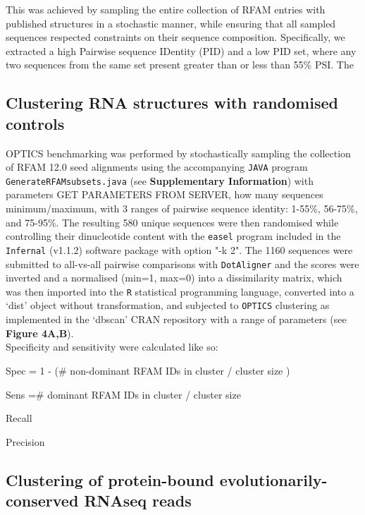 \documentclass[a4paper,11pt]{article}
\newcommand\dotaligner{\texttt{DotAligner}}
\begin{document}
This was achieved by sampling the entire collection of RFAM entries with published structures 
in a stochastic manner, while ensuring that all sampled sequences respected constraints 
on their sequence composition. Specifically, we extracted a high Pairwise sequence IDentity (PID) 
and a low PID set, where any two sequences from the same set present greater than or less than 
55\% PSI. The 

\subsection*{ Clustering RNA structures with randomised controls }
OPTICS benchmarking was performed by stochastically sampling the collection of RFAM 12.0 
seed alignments using the accompanying \texttt{JAVA} program \texttt{GenerateRFAMsubsets.java}
(see \textbf{Supplementary Information}) with parameters {\color{red} GET PARAMETERS FROM SERVER, how many sequences minimum/maximum}, 
with 3 ranges of pairwise sequence identity: 1-55\%, 56-75\%, and 75-95\%.  The resulting
580 unique sequences were then randomised while controlling their dinucleotide content with 
the \texttt{easel} program included in the \texttt{Infernal} (v1.1.2) software package 
\cite{nawrocki2013infernal} with option "-k 2". The 1160 sequences were submitted to 
all-vs-all pairwise comparisons with \dotaligner{} and the scores were inverted and a 
normalised (min=1, max=0) into a dissimilarity matrix, which was then imported into
 the \texttt{R} statistical programming language, converted into a `dist' object without
 transformation, and subjected to \texttt{OPTICS} clustering as implemented
in the `dbscan' CRAN repository with a range of parameters (see \textbf{Figure 4A,B}).\\

 Specificity and sensitivity were calculated like so: 

Spec  = 1 - (\# non-dominant RFAM IDs in cluster /  cluster size )

Sens =\# dominant RFAM IDs in cluster / cluster size 

Recall 

Precision

\subsection*{ Clustering of protein-bound evolutionarily-conserved RNAseq reads }
\end{document}
